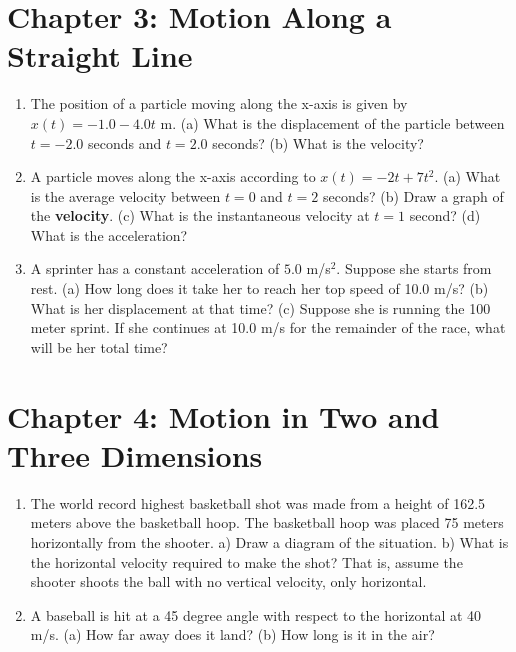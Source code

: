 \documentclass[10pt]{article}
\begin{document}
\section{Chapter 3: Motion Along a Straight Line}

\begin{enumerate}
\item The position of a particle moving along the x-axis is given by $x(t) = -1.0 - 4.0t$ m. (a) What is the displacement of the particle between $t=-2.0$ seconds and $t=2.0$ seconds?  (b) What is the velocity? \\ \vspace{1.5cm}
\item A particle moves along the x-axis according to $x(t) = -2t + 7t^2$.  (a) What is the average velocity between $t=0$ and $t=2$ seconds?  (b) Draw a graph of the \textbf{velocity}.  (c) What is the instantaneous velocity at $t=1$ second?  (d) What is the acceleration? \\ \vspace{3cm}
\item A sprinter has a constant acceleration of $5.0$ m/s$^2$.  Suppose she starts from rest.  (a) How long does it take her to reach her top speed of 10.0 m/s? (b) What is her displacement at that time?  (c) Suppose she is running the 100 meter sprint.  If she continues at 10.0 m/s for the remainder of the race, what will be her total time? \\ \vspace{3cm}
\end{enumerate}

\section{Chapter 4: Motion in Two and Three Dimensions}

\begin{enumerate}
\item The world record highest basketball shot was made from a height of 162.5 meters above the basketball hoop.  The basketball hoop was placed 75 meters horizontally from the shooter.  a) Draw a diagram of the situation.  b) What is the horizontal velocity required to make the shot?  That is, assume the shooter shoots the ball with no vertical velocity, only horizontal. \\ \vspace{4cm}
\item A baseball is hit at a 45 degree angle with respect to the horizontal at 40 m/s.  (a) How far away does it land? (b) How long is it in the air?
\end{enumerate}
\end{document}
